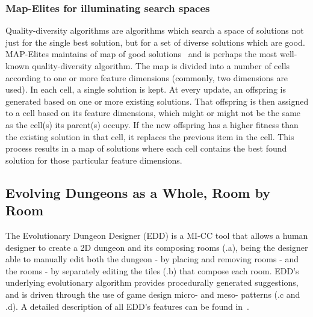 \subsubsection{Map-Elites for illuminating search spaces}

Quality-diversity algorithms are algorithms which search a space of solutions not just for the single best solution, but for a set of diverse solutions which are good. MAP-Elites maintains of map of good solutions~ and is perhaps the most well-known quality-diversity algorithm. The map is divided into a number of cells according to one or more feature dimensions (commonly, two dimensions are used). In each cell, a single solution is kept. At every update, an offspring is generated based on one or more existing solutions. That offspring is then assigned to a cell based on its feature dimensions, which might or might not be the same as the cell(s) its parent(s) occupy. %
If the new offspring has a higher fitness than the existing solution in that cell, it replaces the previous item in the cell. This process results in a map of solutions where each cell contains the best found solution for those particular feature dimensions.

\subsection{Evolving Dungeons as a Whole, Room by Room}

The Evolutionary Dungeon Designer (EDD) is a MI-CC tool that allows a human designer to create a 2D dungeon and its composing rooms (.a), being the designer able to manually edit both the dungeon - by placing and removing rooms - and the rooms - by separately editing the tiles (.b) that compose each room. EDD's underlying evolutionary algorithm provides procedurally generated suggestions, and is driven through the use of game design micro- and meso- patterns (.c and .d). A detailed description of all EDD's features can be found in~.

